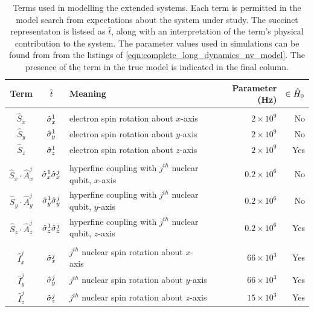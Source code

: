 \par 
\setlength{\tabcolsep}{6.5pt}
\begin{table}[t]
    \begin{tabular}{cclrr}
        Term & $\hat{t}$ & Meaning & Parameter (Hz) & $ \in \hat{H}_0$ \\
        \hline
        \\
        $\hat{S}_x$ & $\hat{\sigma}_{x}^1$ & electron spin rotation about $x$-axis & $ 2\times 10^9 $ & No \\
        $\hat{S}_y$ & $\hat{\sigma}_{y}^1$ & electron spin rotation about $y$-axis & $ 2\times 10^9 $ & No \\
        $\hat{S}_z$ & $\hat{\sigma}_{z}^1$ & electron spin rotation about $z$-axis & $ 2\times 10^9 $ & Yes \\
        \\
        $\hat{S}_x \cdot \hat{A}_x^j$ & $\hat{\sigma}_{x}^1 \hat{\sigma}_{x}^j$ & hyperfine coupling with $j^{th}$ nuclear qubit, $x$-axis & $ 0.2 \times 10^6 $ & No \\
        $\hat{S}_y \cdot \hat{A}_y^j$ & $\hat{\sigma}_{y}^1 \hat{\sigma}_{y}^j$ & hyperfine coupling with $j^{th}$ nuclear qubit, $y$-axis & $ 0.2 \times 10^6 $ & No \\
        $\hat{S}_z \cdot \hat{A}_z^j$ & $\hat{\sigma}_{z}^1 \hat{\sigma}_{z}^j$ & hyperfine coupling with $j^{th}$ nuclear qubit, $z$-axis & $ 0.2 \times 10^6 $ & Yes \\
        \\
        $\hat{I}_x^j$ & $\hat{\sigma}_{x}^j$ & $j^{th}$ nuclear spin rotation about $x$-axis & $ 66\times 10^3$ & Yes \\
        $\hat{I}_y^j$ & $\hat{\sigma}_{y}^j$ & $j^{th}$ nuclear spin rotation about $y$-axis & $ 66\times 10^3 $ & Yes \\
        $\hat{I}_z^j$ & $\hat{\sigma}_{z}^j$ & $j^{th}$ nuclear spin rotation about $z$-axis & $ 15\times 10^3 $ & Yes \\
        \hline 
    \end{tabular}
    \caption[Terms used in modelling the extended nitrogen-vacancy centre systems]{
        Terms used in modelling the extended  systems.
        Each term is permitted in the \gls{model search} from expectations about the system under study. 
        The succinct representaton is listsed as $\hat{t}$, along with an interpretation of the term's physical contribution to the system. 
        The parameter values used in simulations can be found from from the listings of \cref{eqn:complete_long_dynamics_nv_model}. 
        The presence of the term in the \gls{true model} is indicated in the final column. 
    }
    \label{table:nv_gen_alg_term_params}
\end{table}

